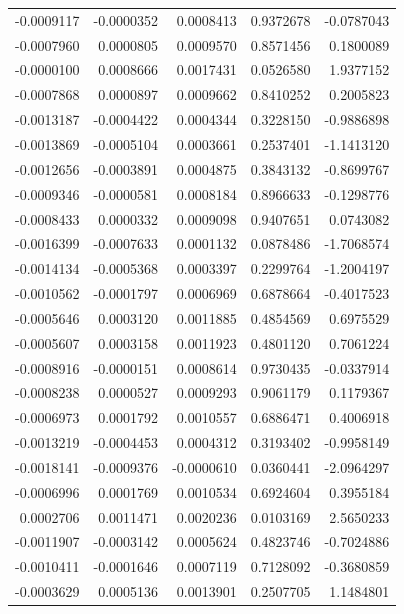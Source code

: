 \documentclass[]{tufte-handout}
\begin{document}
\begin{longtable}[]{@{}rrrrr@{}}
-0.0009117 & -0.0000352 & 0.0008413 & 0.9372678 & -0.0787043 \\
-0.0007960 & 0.0000805 & 0.0009570 & 0.8571456 & 0.1800089 \\
-0.0000100 & 0.0008666 & 0.0017431 & 0.0526580 & 1.9377152 \\
-0.0007868 & 0.0000897 & 0.0009662 & 0.8410252 & 0.2005823 \\
-0.0013187 & -0.0004422 & 0.0004344 & 0.3228150 & -0.9886898 \\
-0.0013869 & -0.0005104 & 0.0003661 & 0.2537401 & -1.1413120 \\
-0.0012656 & -0.0003891 & 0.0004875 & 0.3843132 & -0.8699767 \\
-0.0009346 & -0.0000581 & 0.0008184 & 0.8966633 & -0.1298776 \\
-0.0008433 & 0.0000332 & 0.0009098 & 0.9407651 & 0.0743082 \\
-0.0016399 & -0.0007633 & 0.0001132 & 0.0878486 & -1.7068574 \\
-0.0014134 & -0.0005368 & 0.0003397 & 0.2299764 & -1.2004197 \\
-0.0010562 & -0.0001797 & 0.0006969 & 0.6878664 & -0.4017523 \\
-0.0005646 & 0.0003120 & 0.0011885 & 0.4854569 & 0.6975529 \\
-0.0005607 & 0.0003158 & 0.0011923 & 0.4801120 & 0.7061224 \\
-0.0008916 & -0.0000151 & 0.0008614 & 0.9730435 & -0.0337914 \\
-0.0008238 & 0.0000527 & 0.0009293 & 0.9061179 & 0.1179367 \\
-0.0006973 & 0.0001792 & 0.0010557 & 0.6886471 & 0.4006918 \\
-0.0013219 & -0.0004453 & 0.0004312 & 0.3193402 & -0.9958149 \\
-0.0018141 & -0.0009376 & -0.0000610 & 0.0360441 & -2.0964297 \\
-0.0006996 & 0.0001769 & 0.0010534 & 0.6924604 & 0.3955184 \\
0.0002706 & 0.0011471 & 0.0020236 & 0.0103169 & 2.5650233 \\
-0.0011907 & -0.0003142 & 0.0005624 & 0.4823746 & -0.7024886 \\
-0.0010411 & -0.0001646 & 0.0007119 & 0.7128092 & -0.3680859 \\
-0.0003629 & 0.0005136 & 0.0013901 & 0.2507705 & 1.1484801 \\
\bottomrule
\end{longtable}
\end{document}
